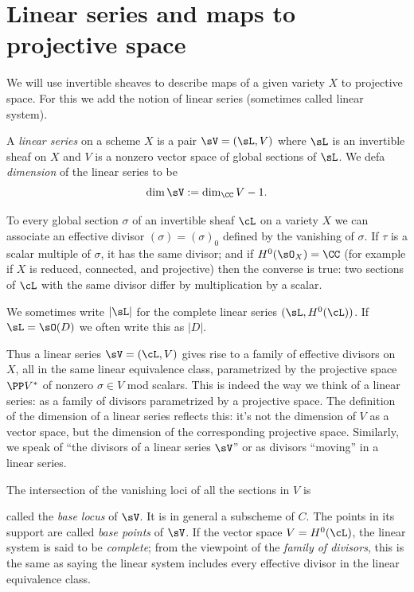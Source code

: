 \section{Linear series and maps to projective space}

We will use invertible sheaves to  describe maps of a given variety $X$ to projective space. For this we add the notion of linear series (sometimes called linear system). 
%
%

\begin{definition}
 A \emph{linear series} on a scheme $X$ is a pair $\sV  = (\sL, V)$ where $\sL$ is an invertible sheaf  on $X$ and
 $V$ is a nonzero vector space of global sections of $\sL$. We defa 
\emph{dimension}
%
of the linear series to be  
 $$
 \dim \sV := \dim_\CC V -1.
 $$
  \end{definition}
  
To every global section $\sigma$ of an invertible sheaf $\cL$ on a variety $X$  we can associate an effective divisor $(\sigma) = (\sigma)_0$ defined by the vanishing of $\sigma$. If $\tau$ is a scalar multiple of $\sigma$, it has the same divisor; and if 
 $H^0(\sO_X) = \CC$ (for example if $X$ is reduced, connected, and
 projective) then the converse is true: two sections of $\cL$ with the same divisor differ by multiplication by a scalar.  
 
 We sometimes write
 $|\sL|$ for the complete linear series $(\sL, H^0(\cL))$. If 
$\sL = \sO(D)$
%
 we often write this as $|D|$.

Thus a linear series $\sV = (\cL, V)$ gives rise to a family of
effective divisors on $X$, all in the same linear equivalence class,
parametrized by the projective space $\PP V^*$ 
of nonzero $\sigma \in V$ mod scalars.
This is indeed the way 
we think of a linear series: as a family of divisors parametrized by a
projective space.
The definition of the dimension
of a linear series 
reflects this: 
it's not the dimension of $V$ as a vector
space, but the dimension of the corresponding projective space. 
Similarly, we speak
 of ``the divisors of
a linear series $\sV$'' or as divisors ``moving'' in a linear series.

The intersection of the vanishing loci of all the sections in $V$ is

%
called the \emph{base locus} of $\sV$. It is in general a subscheme of
$C$. The points in its support are called \emph{base points} of $\sV$.
If the vector space $V = H^0(\cL)$, the linear system is said to be
%
\emph{complete}; 
from the viewpoint
of the \emph{family of divisors},
%
this is the same as saying the linear system includes every
effective divisor in the linear equivalence class. 
 

